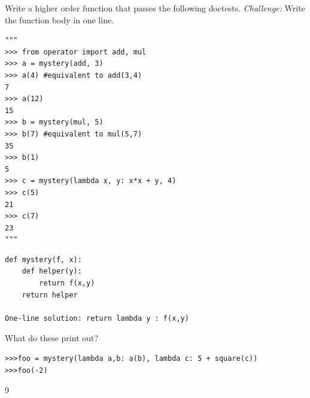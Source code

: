 \documentclass{exam}
\begin{document}
\begin{questions}


\begin{blocksection}
\question Write a higher order function that passes the following doctests. \emph{Challenge:} Write the function body in one line.

\begin{lstlisting}
"""
>>> from operator import add, mul
>>> a = mystery(add, 3)
>>> a(4) #equivalent to add(3,4)
7 
>>> a(12)
15
>>> b = mystery(mul, 5)
>>> b(7) #equivalent to mul(5,7)
35
>>> b(1)
5
>>> c = mystery(lambda x, y: x*x + y, 4)
>>> c(5)
21
>>> c(7)
23
"""
\end{lstlisting}

\begin{solution}[2in]
\begin{lstlisting}
def mystery(f, x):
    def helper(y):
        return f(x,y)
    return helper

One-line solution: return lambda y : f(x,y)
\end{lstlisting}
\end{solution}
\end{blocksection}

\question What do these print out?
\begin{lstlisting}
>>>foo = mystery(lambda a,b: a(b), lambda c: 5 + square(c))
>>>foo(-2)
\end{lstlisting}

\begin{solution}
9
\end{solution}

\end{questions}
\end{document}
